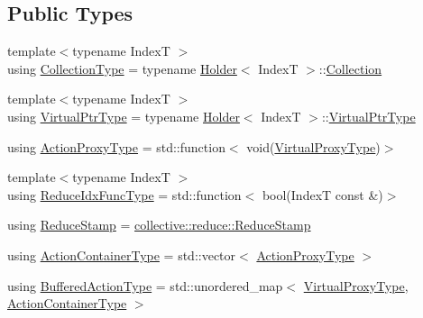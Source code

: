\subsection*{Public Types}
\begin{DoxyCompactItemize}
\item 
{\footnotesize template$<$typename IndexT $>$ }\\using \hyperlink{structvt_1_1vrt_1_1collection_1_1_collection_manager_a47b420577805c257189257eb05516953}{Collection\+Type} = typename \hyperlink{structvt_1_1vrt_1_1collection_1_1_holder}{Holder}$<$ IndexT $>$\+::\hyperlink{structvt_1_1vrt_1_1collection_1_1_collection}{Collection}
\item 
{\footnotesize template$<$typename IndexT $>$ }\\using \hyperlink{structvt_1_1vrt_1_1collection_1_1_collection_manager_a086cab4af6af4f869fbf8814c3a9a6a4}{Virtual\+Ptr\+Type} = typename \hyperlink{structvt_1_1vrt_1_1collection_1_1_holder}{Holder}$<$ IndexT $>$\+::\hyperlink{structvt_1_1vrt_1_1collection_1_1_collection_manager_a086cab4af6af4f869fbf8814c3a9a6a4}{Virtual\+Ptr\+Type}
\item 
using \hyperlink{structvt_1_1vrt_1_1collection_1_1_collection_manager_a98a759caf144277dcd341cdbd5538f59}{Action\+Proxy\+Type} = std\+::function$<$ void(\hyperlink{namespacevt_a1b417dd5d684f045bb58a0ede70045ac}{Virtual\+Proxy\+Type})$>$
\item 
{\footnotesize template$<$typename IndexT $>$ }\\using \hyperlink{structvt_1_1vrt_1_1collection_1_1_collection_manager_a47a3227ae0195c15187e8dc8762f66c4}{Reduce\+Idx\+Func\+Type} = std\+::function$<$ bool(IndexT const  \&)$>$
\item 
using \hyperlink{structvt_1_1vrt_1_1collection_1_1_collection_manager_ae8aac19e0ae07e9225142e5880eac830}{Reduce\+Stamp} = \hyperlink{namespacevt_1_1collective_1_1reduce_a7b7cb3021ac5654d92825d9fab0250b2}{collective\+::reduce\+::\+Reduce\+Stamp}
\item 
using \hyperlink{structvt_1_1vrt_1_1collection_1_1_collection_manager_a536805fb5c58b557b66e7d7febe87567}{Action\+Container\+Type} = std\+::vector$<$ \hyperlink{structvt_1_1vrt_1_1collection_1_1_collection_manager_a98a759caf144277dcd341cdbd5538f59}{Action\+Proxy\+Type} $>$
\item 
using \hyperlink{structvt_1_1vrt_1_1collection_1_1_collection_manager_a7b32db0e6ccafa771ddd72f534a1cf8c}{Buffered\+Action\+Type} = std\+::unordered\+\_\+map$<$ \hyperlink{namespacevt_a1b417dd5d684f045bb58a0ede70045ac}{Virtual\+Proxy\+Type}, \hyperlink{structvt_1_1vrt_1_1collection_1_1_collection_manager_a536805fb5c58b557b66e7d7febe87567}{Action\+Container\+Type} $>$

\end{DoxyCompactItemize}
